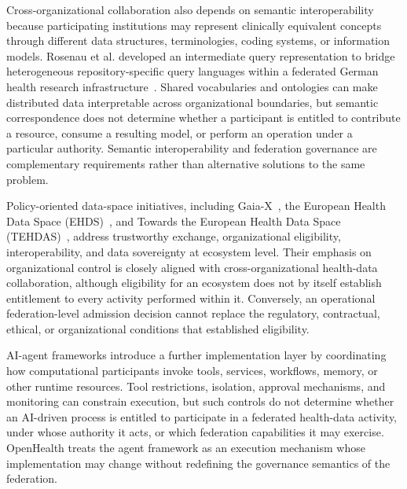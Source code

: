 \documentclass[twoside,11pt]{article}
\begin{document}
Cross-organizational collaboration also depends on semantic interoperability because participating institutions may represent clinically equivalent concepts through different data structures, terminologies, coding systems, or information models. Rosenau et al. developed an intermediate query representation to bridge heterogeneous repository-specific query languages within a federated German health research infrastructure~\cite{Rosenau_2024}. Shared vocabularies and ontologies can make distributed data interpretable across organizational boundaries, but semantic correspondence does not determine whether a participant is entitled to contribute a resource, consume a resulting model, or perform an operation under a particular authority. Semantic interoperability and federation governance are   complementary requirements rather than alternative solutions to the same problem.

Policy-oriented data-space initiatives, including Gaia-X~\cite{GaiaX}, the European Health Data Space (EHDS)~\cite{EuropeanCommission_EHDS}, and Towards the European Health Data Space (TEHDAS)~\cite{TEHDAS}, address trustworthy exchange, organizational eligibility, interoperability, and data sovereignty at ecosystem level. Their emphasis on organizational control is closely aligned with cross-organizational health-data collaboration, although eligibility for an ecosystem does not by itself establish entitlement to every activity performed within it. Conversely, an operational federation-level admission decision cannot replace the regulatory, contractual, ethical, or organizational conditions that established eligibility.

AI-agent frameworks introduce a further implementation layer by coordinating how computational participants invoke tools, services, workflows, memory, or other runtime resources. Tool restrictions, isolation, approval mechanisms, and monitoring can constrain execution, but such controls do not determine whether an AI-driven process is entitled to participate in a federated health-data activity, under whose authority it acts, or which federation capabilities it may exercise. OpenHealth   treats the agent framework as an execution mechanism whose implementation may change without redefining the governance semantics of the federation.
\end{document}
